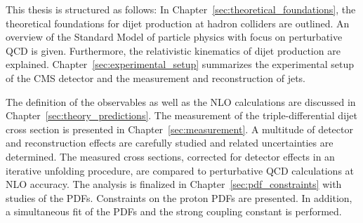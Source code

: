 %
This thesis is structured as follows: In
Chapter~\ref{sec:theoretical_foundations}, the theoretical foundations for dijet
production at hadron colliders are outlined. An overview of the Standard Model
of particle physics with focus on perturbative QCD is given.  Furthermore, the
relativistic kinematics of dijet production are explained.
Chapter~\ref{sec:experimental_setup} summarizes the experimental setup of the
CMS detector and the measurement and reconstruction of jets. 

The definition of the observables as well as the NLO calculations are discussed
in Chapter~\ref{sec:theory_predictions}. The measurement of the
triple-differential dijet cross section is presented in
Chapter~\ref{sec:measurement}. A multitude of detector and reconstruction
effects are carefully studied and related uncertainties are determined. The
measured cross sections, corrected for detector effects in an iterative
unfolding procedure, are compared to perturbative QCD calculations at NLO
accuracy. The analysis is finalized in Chapter~\ref{sec:pdf_constraints} with
studies of the PDFs. Constraints on the proton PDFs are presented. In addition,
a simultaneous fit of the PDFs and the strong coupling constant is performed.

